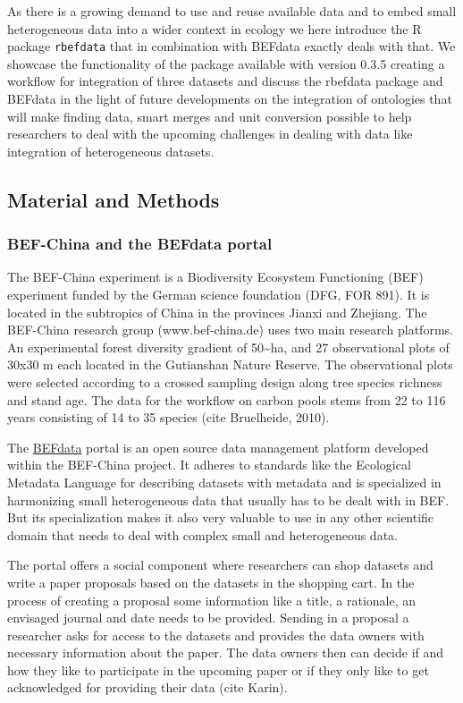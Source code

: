 \documentclass[]{article}
\begin{document}
As there is a growing demand to use and reuse available data and to
embed small heterogeneous data into a wider context in ecology we here
introduce the R package \texttt{rbefdata} that in combination with
BEFdata exactly deals with that. We showcase the functionality of the
package available with version 0.3.5 creating a workflow for integration
of three datasets and discuss the rbefdata package and BEFdata in the
light of future developments on the integration of ontologies that will
make finding data, smart merges and unit conversion possible to help
researchers to deal with the upcoming challenges in dealing with data
like integration of heterogeneous datasets.

\subsection{Material and Methods}

\subsubsection{BEF-China and the BEFdata portal}

The BEF-China experiment is a Biodiversity Ecosystem Functioning (BEF)
experiment funded by the German science foundation (DFG, FOR 891). It is
located in the subtropics of China in the provinces Jianxi and Zhejiang.
The BEF-China research group (www.bef-china.de) uses two main research
platforms. An experimental forest diversity gradient of
50\textasciitilde{}ha, and 27 observational plots of 30x30 m each
located in the Gutianshan Nature Reserve. The observational plots were
selected according to a crossed sampling design along tree species
richness and stand age. The data for the workflow on carbon pools stems
from 22 to 116 years consisting of 14 to 35 species (cite Bruelheide,
2010).

The \href{http://befdataproduction.biow.uni-leipzig.de/}{BEFdata} portal
is an open source data management platform developed within the
BEF-China project. It adheres to standards like the Ecological Metadata
Language for describing datasets with metadata and is specialized in
harmonizing small heterogeneous data that usually has to be dealt with
in BEF. But its specialization makes it also very valuable to use in any
other scientific domain that needs to deal with complex small and
heterogeneous data.

The portal offers a social component where researchers can shop datasets
and write a paper proposals based on the datasets in the shopping cart.
In the process of creating a proposal some information like a title, a
rationale, an envisaged journal and date needs to be provided. Sending
in a proposal a researcher asks for access to the datasets and provides
the data owners with necessary information about the paper. The data
owners then can decide if and how they like to participate in the
upcoming paper or if they only like to get acknowledged for providing
their data (cite Karin).
\end{document}

